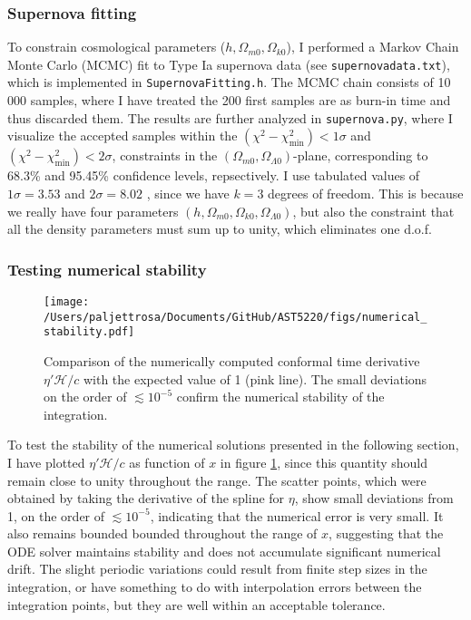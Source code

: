 \documentclass{aa}
\begin{document}
\subsubsection{Supernova fitting}
To constrain cosmological parameters ($h, \Omega_{m0}, \Omega_{k0}$), I performed a Markov Chain Monte Carlo (MCMC) fit to Type Ia supernova data (see \verb|supernovadata.txt|), which is implemented in \verb|SupernovaFitting.h|. The MCMC chain consists of 10$\,$000 samples, where I have treated the 200 first samples are as burn-in time and thus discarded them. The results are further analyzed in \verb|supernova.py|, where I visualize the accepted samples within the $(\chi^2-\chi^2_\text{min})<1\sigma$ and $(\chi^2-\chi^2_\text{min})<2\sigma$, constraints in the $(\Omega_{m0},\Omega_{\Lambda0})$-plane, corresponding to 68.3\% and 95.45\% confidence levels, repsectively. I use tabulated values of $1\sigma=3.53$ and $2\sigma=8.02$ \citep[see][]{Chi2}, since we have $k=3$ degrees of freedom. This is because we really have four parameters $(h, \Omega_{m0}, \Omega_{k0}, \Omega_{\Lambda0})$, but also the constraint that all the density parameters must sum up to unity, which eliminates one d.o.f. 

\subsubsection{Testing numerical stability}
\begin{figure}
    \centering
    \texttt{[image: /Users/paljettrosa/Documents/GitHub/AST5220/figs/numerical\_stability.pdf]}
    \caption{Comparison of the numerically computed conformal time derivative  $\eta'\mathcal{H}/c$ with the expected value of 1 (pink line). The small deviations on the order of $\lesssim 10^{-5}$ confirm the numerical stability of the integration.}\label{fig:numerical stability}
\end{figure}

To test the stability of the numerical solutions presented in the following section, I have plotted $\eta'\mathcal{H}/c$ as function of $x$ in figure \ref{fig:numerical stability}, since this quantity should remain close to unity throughout the range. The scatter points, which were obtained by taking the derivative of the spline for $\eta$, show small deviations from 1, on the order of $\lesssim 10^{-5}$, indicating that the numerical error is very small. It also remains bounded bounded throughout the range of $x$, suggesting that the ODE solver maintains stability and does not accumulate significant numerical drift. The slight periodic variations could result from finite step sizes in the integration, or have something to do with interpolation errors between the integration points, but they are well within an acceptable tolerance.
\end{document}
